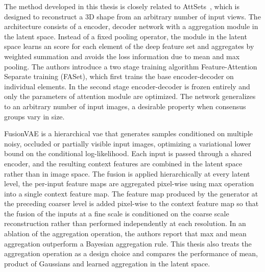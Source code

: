 \documentclass[
  numbers=noenddot,
  english,  %
  a4paper,  %
  twoside,  %
  bibliography=totoc,
  headsepline,
  cleardoublepage=empty,
  parskip=half,
  draft=false
]{scrbook}
\theoremstyle{break}
\begin{document}
The method developed in this thesis is closely related to AttSets~\cite{c25}, which is designed to reconstruct a 3D shape from an arbitrary number of input views. The architecture consists of a encoder, decoder network with a  aggregation module in the latent space. Instead of a fixed pooling operator, the module in the latent space learns an score for each element of the deep feature set and aggregates by weighted summation and avoids the loss information due to mean and max pooling. The authors introduce a two stage training algorithm Feature-Attention Separate training (FASet), which first trains the base encoder-decoder on individual elements. In the second stage encoder-decoder is frozen entirely and only the parameters of attention module are optimized. The network generalizes to an arbitrary number of input images, a desirable property when consensus groups vary in size. %


FusionVAE \cite{c27} is a hierarchical \gls{vae} that generates samples conditioned on multiple noisy, occluded or partially visible input images, optimizing a variational lower bound on the conditional log-likelihood. Each input is passed through a shared encoder, and the resulting context features are combined in the latent space rather than in image space. The fusion is applied hierarchically at every latent level, the per-input feature maps are aggregated pixel-wise using max operation into a single context feature map. The feature map produced by the generator at the preceding coarser level is added pixel-wise to the context feature map so that the fusion of the inputs at a fine scale is conditioned on the coarse scale reconstruction rather than performed independently at each resolution. In an ablation of the aggregation
operation, the authors report that max and mean aggregation outperform a Bayesian aggregation rule. This thesis also treats the aggregation operation as a design choice and compares the performance of mean, product of Gaussians and learned aggregation in the latent space.
\end{document}
